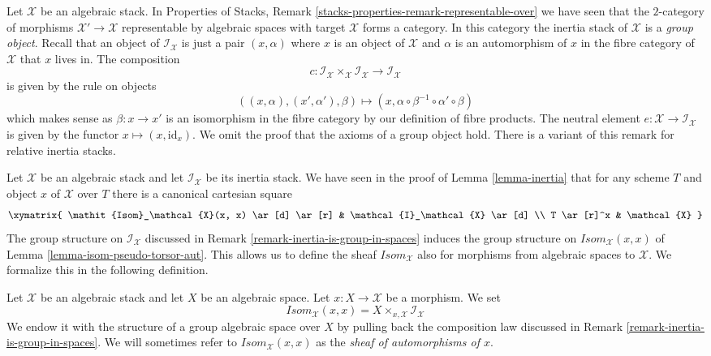 \begin{remark}
\label{remark-inertia-is-group-in-spaces}
Let $\mathcal{X}$ be an algebraic stack. In
Properties of Stacks, Remark \ref{stacks-properties-remark-representable-over}
we have seen that the $2$-category of morphisms
$\mathcal{X}' \to \mathcal{X}$ representable by algebraic spaces
with target $\mathcal{X}$ forms a category.
In this category the inertia stack of $\mathcal{X}$ is
a {\it group object}. Recall that an object of $\mathcal{I}_\mathcal{X}$
is just a pair $(x, \alpha)$ where $x$ is an object of $\mathcal{X}$
and $\alpha$ is an automorphism of $x$ in the fibre category of $\mathcal{X}$
that $x$ lives in. The composition
$$
c :
\mathcal{I}_\mathcal{X} \times_\mathcal{X} \mathcal{I}_\mathcal{X}
\longrightarrow
\mathcal{I}_\mathcal{X}
$$
is given by the rule on objects
$$
((x, \alpha), (x', \alpha'), \beta) \mapsto
(x, \alpha \circ \beta^{-1} \circ \alpha' \circ \beta)
$$
which makes sense as $\beta : x \to x'$ is an isomorphism in the fibre
category by our definition of fibre products. The neutral element
$e : \mathcal{X} \to \mathcal{I}_\mathcal{X}$ is given by the
functor $x \mapsto (x, \text{id}_x)$. We omit the proof that the
axioms of a group object hold.
There is a variant of this remark for relative inertia stacks.
\end{remark}

\noindent
Let $\mathcal{X}$ be an algebraic stack and let $\mathcal{I}_\mathcal{X}$
be its inertia stack. We have seen in the proof of
Lemma \ref{lemma-inertia}
that for any scheme $T$ and object $x$ of $\mathcal{X}$ over $T$ there is
a canonical cartesian square
$$
\xymatrix{
\mathit{Isom}_\mathcal{X}(x, x) \ar[d] \ar[r] &
\mathcal{I}_\mathcal{X} \ar[d] \\
T \ar[r]^x & \mathcal{X}
}
$$
The group structure on $\mathcal{I}_\mathcal{X}$ discussed in
Remark \ref{remark-inertia-is-group-in-spaces}
induces the group structure on $\mathit{Isom}_\mathcal{X}(x, x)$ of
Lemma \ref{lemma-isom-pseudo-torsor-aut}.
This allows us to define the sheaf $\mathit{Isom}_\mathcal{X}$
also for morphisms from algebraic spaces to $\mathcal{X}$. We formalize
this in the following definition.

\begin{definition}
\label{definition-isom}
Let $\mathcal{X}$ be an algebraic stack and let $X$ be an algebraic space.
Let $x : X \to \mathcal{X}$ be a morphism. We set
$$
\mathit{Isom}_\mathcal{X}(x, x) =
X \times_{x, \mathcal{X}} \mathcal{I}_\mathcal{X}
$$
We endow it with the structure of a group algebraic space over $X$
by pulling back the composition law discussed in
Remark \ref{remark-inertia-is-group-in-spaces}.
We will sometimes refer to $\mathit{Isom}_\mathcal{X}(x, x)$ as the
{\it sheaf of automorphisms of $x$}.
\end{definition}

